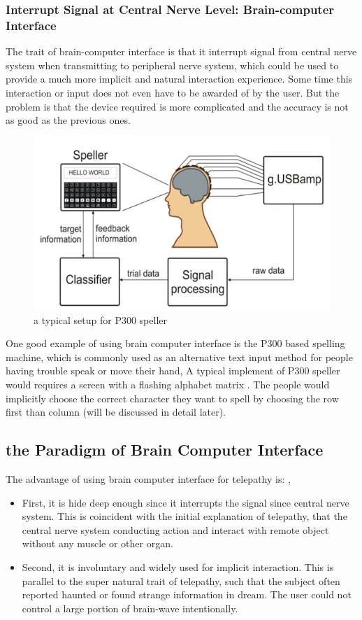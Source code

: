 \documentclass[a4paper]{article}
\begin{document}
\subsubsection{Interrupt Signal at Central Nerve Level: Brain-computer Interface}

The trait of brain-computer interface is that it interrupt signal from central nerve system when transmitting to peripheral nerve system, which could be used to provide a much more implicit and natural interaction experience. Some time this interaction or input does not even have to be awarded of by the user. But the problem is that the device required is more complicated and the accuracy is not as good as the previous ones.

\begin{figure}
	\centering
	\includegraphics[width= 0.8 \linewidth]{P300Dia}
	\caption{a typical setup for P300 speller}
	\label{fig:300Spell}
\end{figure}


One good example of using brain computer interface is the P300 based spelling machine, which is commonly used as an alternative text input method for people having trouble speak or move their hand, A typical implement of P300 speller\autocite{krusienski2008toward} would requires a screen with a flashing alphabet matrix \autocite{sakai2012alphabet}. The people would implicitly choose the correct character they want to spell by choosing the row first than column (will be discussed in detail later).

\subsection{the Paradigm of Brain Computer Interface}

The advantage of using brain computer interface for telepathy is: ,

\begin{itemize}
\item First, it is hide deep enough since it interrupts the signal since central nerve system. This is coincident with the initial explanation of telepathy, that the central nerve system conducting action and interact with remote object without any muscle or other organ.
\item Second, it is involuntary and widely used for implicit interaction. This is parallel to the super natural trait of telepathy, such that the subject often reported haunted or found strange information in dream. The user could not control a large portion of brain-wave intentionally.
\end{itemize}
\end{document}
